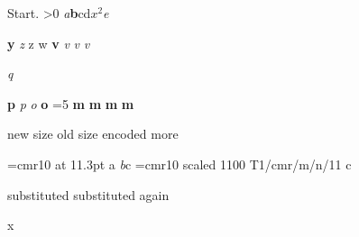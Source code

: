 \documentclass{article}
\makeatletter
\newcommand\loopfonts[1]{\@tempcnta=#1\relax
  \loop\ifnum\@tempcnta>0
    {\itshape a}{\bfseries b}{\sffamily c}{\small d}{\footnotesize $x^2$}{\large\slshape e}
    \advance\@tempcnta-1
  \repeat}
\makeatother
\begin{document}
Start. \loopfonts{50}

\afterassignment{}
\afterassignment\relax\def\y{}\selectfont

{  {\bfseries y}}
{ {\itshape z}}
{ {\sffamily z}}
{ {\sffamily w}}
{ {\bfseries v}}
{ {\slshape v}}
{ {\slshape v}}
{  {\slshape v}}

{ {\itshape q} }
\typeout{\meaning\MT@font; \meaning\MT@family}

{\let\MT@tracking\empty {\bfseries p}}
{\def\MT@check@font{\MT@exp@one@n\MT@in@clist\MT@font\MT@font@list\relax}{\itshape p}}
{\let\expandafter\expandafter {\itshape o}}
{\let\m@ne\z@ {\bfseries o}}
{=5 {\bfseries m}}
{\def\define@newfont{\fi\fi}{\bfseries m}}
{\let\define@newfont\iftrue {\bfseries m}\fi}
{\let\MT@copy@font\empty {\bfseries m}}

{\fontsize{13.3}{15}\selectfont new size}
{\fontsize{13.3}{15}\selectfont old size}
{ encoded}
{\selectfont more}

\font\zz=cmr10 at 11.3pt
{\fontsize{11.3}{13}\selectfont a}
\font=0pt
{\itshape b}{\fontsize{11.3}{13}\selectfont c}
{\def\font@name{\nullfont}\pickup@font}
{\font\yy=cmr10 scaled 1100 \expandafter\let\csname OT1/cmr/m/n/11\endcsname\yy {}\yy=0pt \fontsize{11}{13}\selectfont c}

{\selectfont substituted}
{\selectfont substituted again}

{\let\font@name\relax \pickup@font}
{\def\font@name{\relax\relax}\pickup@font}
{\def\font@name{}\pickup@font}
{\def\font@name#1{}\pickup@font x}
{\def\font@name{a}\pickup@font}
\end{document}
